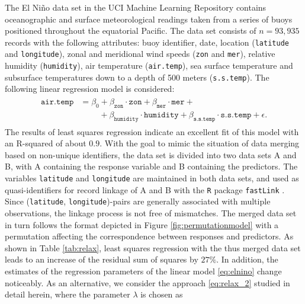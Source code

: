 \documentclass[11pt]{article}
\begin{document}
The El Ni\~no data set in the UCI Machine Learning Repository \cite{UCI} contains oceanographic and surface meteorological readings taken from a series of buoys positioned throughout the equatorial Pacific. The data set consists of $n = 93,935$ records with the following attributes: buoy identifier, date, location (\texttt{latitude} and \texttt{longitude}), zonal and meridional wind speeds (\texttt{zon}  and \texttt{mer}), relative humidity (\texttt{humidity}), air temperature (\texttt{air.temp}), sea surface temperature and subsurface temperatures down to a depth of 500 meters (\texttt{s.s.temp}). The following linear regression model is considered:
\begin{align}\label{eq:elnino}
\begin{split}
\texttt{air.temp} & = \beta_0 + \beta_{\texttt{zon}} \cdot \texttt{zon} + \beta_{\texttt{mer}} \cdot \texttt{mer} +   \\
                  &\;\qquad + \beta_{\texttt{humidity}} \cdot \texttt{humidity}  +  \beta_{\texttt{s.s.temp}} \cdot \texttt{s.s.temp} + \epsilon.
\end{split}
\end{align}
The results of least squares regression 
indicate an excellent fit of this model with an R-squared of about $0.9$. With the goal to mimic the situation of data merging
based on non-unique identifiers, the data set is divided into two data sets A and B, with A containing the response variable and B containing the predictors. The variables \texttt{latitude} and \texttt{longitude} are maintained in both data sets, and used as quasi-identifiers for record linkage of A and B with the \texttt{R} package \texttt{fastLink} \cite{fastlink}. Since (\texttt{latitude}, \texttt{longitude})-pairs are generally associated with multiple observations, the linkage process is not free of mismatches. The merged data set in turn follows the format depicted in Figure \ref{fig:permutationmodel} with 
a permutation affecting the correspondence between responses and predictors. As shown in Table \ref{tab:relax}, least squares regression with the thus merged data set leads to an increase of the residual sum of squares by $27\%$. In addition, the estimates of the regression parameters of the linear model \eqref{eq:elnino} change noticeably. As an alternative, we consider the approach \eqref{eq:relax_2} studied in detail herein, where the parameter $\lambda$ is chosen as 
\end{document}
